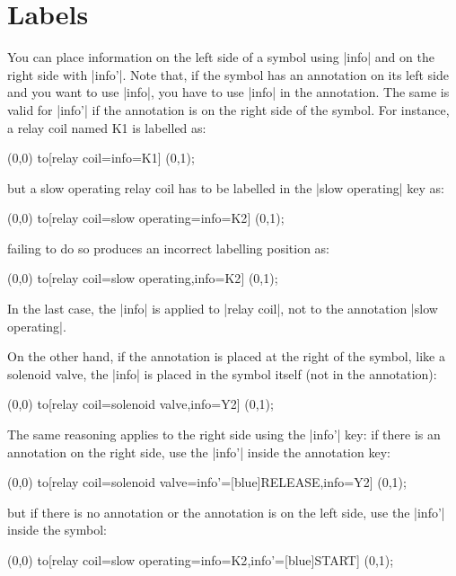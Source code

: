 \documentclass[a4paper]{ltxdoc}
\begin{document}
\section{Labels\label{sec:labels}}
You can place information on the left side of a symbol using |info| and on the right side with |info'|. Note that, if the symbol has an annotation on its left side and you want to use |info|, you have to use |info| in the annotation. The same is valid for |info'| if the annotation is on the right side of the symbol. 
For instance, a relay coil named K1 is labelled as:
\begin{codeexample}[width=2.5cm]
  \draw (0,0) to[relay coil={info=K1}] (0,1);
\end{codeexample}
\noindent{}but a slow operating relay coil has to be labelled in the |slow operating| key as:
\begin{codeexample}[width=2.5cm]
  \draw (0,0) to[relay coil={slow operating={info=K2}}] (0,1);
\end{codeexample}
\noindent{}failing to do so produces an incorrect labelling position as:
\begin{codeexample}[width=2.5cm]
  \draw (0,0) to[relay coil={slow operating,info=K2}] (0,1);
\end{codeexample}
\noindent{}In the last case, the |info| is applied to |relay coil|, not to the annotation |slow operating|.

On the other hand, if the annotation is placed at the right of the symbol, like a solenoid valve, the |info| is placed in the symbol itself (not in the annotation):
\begin{codeexample}[width=3cm]
  \draw (0,0) to[relay coil={solenoid valve,info=Y2}] (0,1);
\end{codeexample}

The same reasoning applies to the right side using the |info'| key: if there is an annotation on the right side, use the |info'| inside the annotation key:
\begin{codeexample}[width=4.5cm]
  \draw (0,0)
    to[relay coil={solenoid valve={info'={[blue]RELEASE}},info=Y2}] (0,1);
\end{codeexample}
\noindent{}but if there is no annotation or the annotation is on the left side, use the |info'| inside the symbol:
\begin{codeexample}[width=3.8cm]
  \draw (0,0)
    to[relay coil={slow operating={info=K2},info'={[blue]START}}] (0,1);
\end{codeexample}
\end{document}
